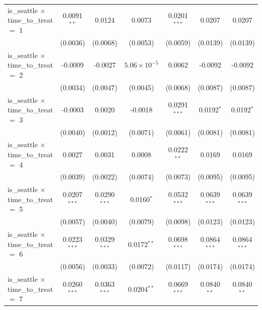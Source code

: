 \documentclass{article}
\begin{document}
\begin{appendices}
\begin{table}[ht]
{\begin{tabular}{lcccccc}
   is\_seattle $\times$ time\_to\_treat $=$ 1      & 0.0091$^{**}$  & 0.0124          & 0.0073                & 0.0201$^{***}$  & 0.0207          & 0.0207\\   
                                                   & (0.0036)       & (0.0068)        & (0.0053)              & (0.0059)        & (0.0139)        & (0.0139)\\   
   is\_seattle $\times$ time\_to\_treat $=$ 2      & -0.0009        & -0.0027         & $5.06\times 10^{-5}$  & 0.0062          & -0.0092         & -0.0092\\   
                                                   & (0.0034)       & (0.0047)        & (0.0045)              & (0.0068)        & (0.0087)        & (0.0087)\\   
   is\_seattle $\times$ time\_to\_treat $=$ 3      & -0.0003        & 0.0020          & -0.0018               & 0.0291$^{***}$  & 0.0192$^{*}$    & 0.0192$^{*}$\\   
                                                   & (0.0040)       & (0.0012)        & (0.0071)              & (0.0061)        & (0.0081)        & (0.0081)\\   
   is\_seattle $\times$ time\_to\_treat $=$ 4      & 0.0027         & 0.0031          & 0.0008                & 0.0222$^{**}$   & 0.0169          & 0.0169\\   
                                                   & (0.0039)       & (0.0022)        & (0.0074)              & (0.0073)        & (0.0095)        & (0.0095)\\   
   is\_seattle $\times$ time\_to\_treat $=$ 5      & 0.0207$^{***}$ & 0.0290$^{***}$  & 0.0160$^{*}$          & 0.0532$^{***}$  & 0.0639$^{***}$  & 0.0639$^{***}$\\   
                                                   & (0.0057)       & (0.0040)        & (0.0079)              & (0.0098)        & (0.0123)        & (0.0123)\\   
   is\_seattle $\times$ time\_to\_treat $=$ 6      & 0.0223$^{***}$ & 0.0329$^{***}$  & 0.0172$^{**}$         & 0.0698$^{***}$  & 0.0864$^{***}$  & 0.0864$^{***}$\\   
                                                   & (0.0056)       & (0.0033)        & (0.0072)              & (0.0117)        & (0.0174)        & (0.0174)\\   
   is\_seattle $\times$ time\_to\_treat $=$ 7      & 0.0260$^{***}$ & 0.0363$^{***}$  & 0.0204$^{**}$         & 0.0669$^{***}$  & 0.0840$^{**}$   & 0.0840$^{**}$\\   

\end{tabular}}
\end{table}
\end{appendices}
\end{document}

